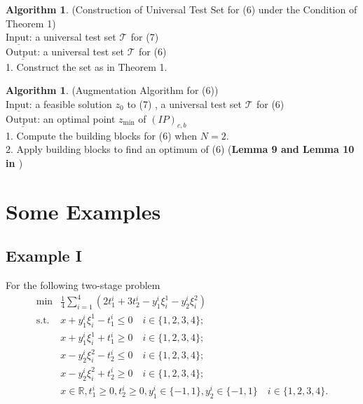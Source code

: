 \documentclass{article}
\theoremstyle{plain}
\theoremstyle{definition}
\newtheorem{algorithm}[theorem]{Algorithm}
\begin{document}
\begin{propsition}
 \begin{algorithm} (Construction of Universal Test Set for (6) under the Condition of Theorem 1) \\
$\underline{\text{Input:}}$ a universal test set  $\mathcal{T}_{}$  for  (7) \\
$\underline{\text {Output:}} $ a universal test set  $\mathcal{T}_{}$ for (6) \\
1. Construct the set as in Theorem 1.\end{algorithm}
 
 \begin{algorithm} (Augmentation Algorithm for (6)) \\
$\underline{\text{Input:}}$ a feasible solution  $z_{0}$  to  (7) , a universal test set  $\mathcal{T}_{}$  for  (6) \\
$\underline{\text {Output:}} $ an optimal point  $z_{\min }$  of  $(I P)_{c, b}$ \\
1. Compute the  building blocks  for  (6) when $N=2$.  \\
2. Apply  building blocks to find an optimum of (6) (\textbf{Lemma 9 and Lemma 10 in \cite{ref2}})\end{algorithm}


\section{Some Examples}

\subsection{Example I}
For the following two-stage problem
\begin{align*}
 \min &\frac{1}{4} \sum_{i=1}^{4}\left(2 t_{1}^{i}+3 t_{2}^{i}-y_{1}^{i} \xi_{i}^{1}-y_{2}^{i} \xi_{i}^{2}\right) \\
\text{s.t. }  &x+y_{1}^{i} \xi_{i}^{1}-t_{1}^{i} \leq 0 \quad i \in\{1,2,3,4\} ; \\
& x+y_{1}^{i} \xi_{i}^{1}+t_{1}^{i} \geq 0 \quad i \in\{1,2,3,4\} ; \\
& x-y_{2}^{i} \xi_{i}^{2}-t_{2}^{i} \leq 0 \quad i \in\{1,2,3,4\} ; \\
& x-y_{2}^{i} \xi_{i}^{2}+t_{2}^{i} \geq 0 \quad i \in\{1,2,3,4\} ; \\
& x \in \mathbb{R}, t_{1}^{i} \geq 0, t_{2}^{i} \geq 0, y_{1}^{i} \in\{-1,1\}, y_{2}^{i} \in\{-1,1\} \quad i \in\{1,2,3,4\} . \\
 \end{align*}
 

\end{propsition}
\end{document}
